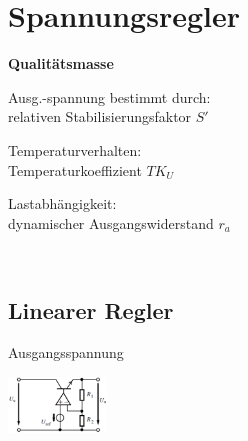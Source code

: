 	\section{Spannungsregler}
        {\bf{Qualit\"atsmasse}}\\
            \begin{minipage}[t]{6cm}
                Ausg.-spannung bestimmt durch:\\
                relativen Stabilisierungsfaktor $S'$\\
            \end{minipage}
            \begin{minipage}[t]{6cm}
                Temperaturverhalten:\\
                Temperaturkoeffizient $TK_U$\\
            \end{minipage}
            \begin{minipage}[t]{6cm}
                Lastabh\"angigkeit:\\
                dynamischer Ausgangswiderstand $r_a$\\
            \end{minipage}\\    
        \subsection{Linearer Regler}
            \begin{minipage}[T]{14cm}
                Ausgangsspannung
                \hspace{13mm}\\
            \end{minipage}
            \begin{minipage}{5cm}
                \includegraphics[height=1.5cm]{./bilder/ReglerLinear.png}
            \end{minipage}\\
            
